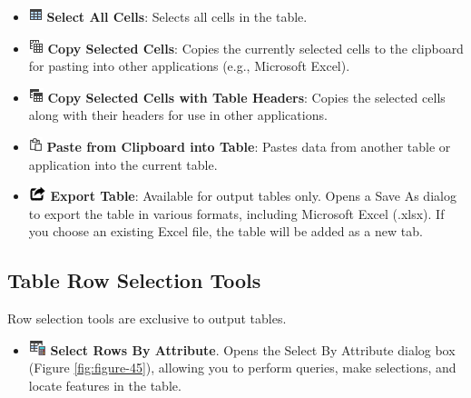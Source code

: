 \documentclass[
]{book}
\providecommand{\tightlist}{%
  \setlength{\itemsep}{0pt}\setlength{\parskip}{0pt}}
\begin{document}
\begin{itemize}
\item
  \includegraphics{images/selectallcells.png} \textbf{Select All Cells}: Selects all cells in the table.
\item
  \includegraphics{images/copyselectedcells.png} \textbf{Copy Selected Cells}: Copies the currently selected cells to the clipboard for pasting into other applications (e.g., Microsoft Excel).
\item
  \includegraphics{images/copywheaders.png} \textbf{Copy Selected Cells with Table Headers}: Copies the selected cells along with their headers for use in other applications.
\item
  \includegraphics{images/tablepaste.png} \textbf{Paste from Clipboard into Table}: Pastes data from another table or application into the current table.
\item
  \includegraphics{images/exporttable.png} \textbf{Export Table}: Available for output tables only. Opens a Save As dialog to export the table in various formats, including Microsoft Excel (.xlsx). If you choose an existing Excel file, the table will be added as a new tab.
\end{itemize}

\hypertarget{table-row-selection-tools}{%
\subsection{Table Row Selection Tools}\label{table-row-selection-tools}}

Row selection tools are exclusive to output tables.

\begin{itemize}
\tightlist
\item
  \includegraphics{images/selectbyattribute.png} \textbf{Select Rows By Attribute}. Opens the Select By Attribute dialog box (Figure \ref{fig:figure-45}), allowing you to perform queries, make selections, and locate features in the table.
\end{itemize}
\end{document}
